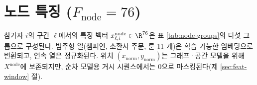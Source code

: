 
\section{노드 특징 ($F_{\mathrm{node}} = 76$)}
\label{sec:feat-node}

참가자 $i$의 구간 $\ell$에서의 특징 벡터 $x^{\mathrm{node}}_{\ell,i} \in \R^{76}$은 표 \ref{tab:node-groups}의 다섯 그룹으로 구성된다. 범주형 열(챔피언, 소환사 주문, 룬 11 개)은 학습 가능한 임베딩으로 변환되고, 연속 열은 정규화된다. 위치 $(x_{\mathrm{norm}}, y_{\mathrm{norm}})$는 그래프·공간 모델을 위해 $X^{\mathrm{node}}$에 보존되지만, 순차 모델용 거시 시퀀스에서는 0으로 마스킹된다(제 \ref{sec:feat-window} 절).


